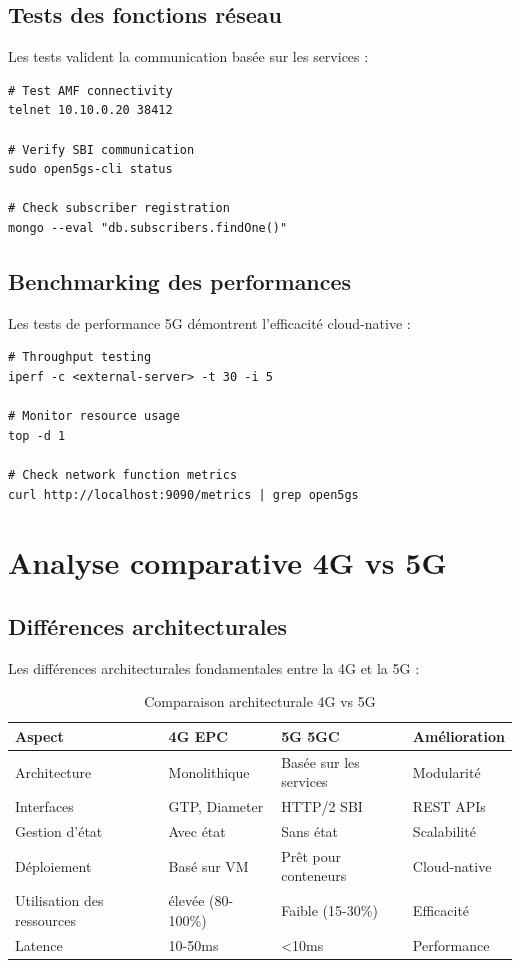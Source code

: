 \documentclass[12pt,a4paper]{report}
\begin{document}
\subsection{Tests des fonctions réseau}

Les tests valident la communication basée sur les services :

\begin{lstlisting}[caption=5G Network Function Testing]
# Test AMF connectivity
telnet 10.10.0.20 38412

# Verify SBI communication
sudo open5gs-cli status

# Check subscriber registration
mongo --eval "db.subscribers.findOne()"
\end{lstlisting}

\subsection{Benchmarking des performances}

Les tests de performance 5G démontrent l'efficacité cloud-native :

\begin{lstlisting}[caption=Tests de performance 5G]
# Throughput testing
iperf -c <external-server> -t 30 -i 5

# Monitor resource usage
top -d 1

# Check network function metrics
curl http://localhost:9090/metrics | grep open5gs
\end{lstlisting}

\section{Analyse comparative 4G vs 5G}

\subsection{Différences architecturales}

Les différences architecturales fondamentales entre la 4G et la 5G :

\begin{table}[H]
\centering
\caption{Comparaison architecturale 4G vs 5G}
\label{tab:architectural-comparison}
\begin{tabular}{@{}llll@{}}
\toprule
Aspect & 4G EPC & 5G 5GC & Amélioration \\
\midrule
Architecture & Monolithique & Basée sur les services & Modularité \\
Interfaces & GTP, Diameter & HTTP/2 SBI & REST APIs \\
Gestion d'état & Avec état & Sans état & Scalabilité \\
Déploiement & Basé sur VM & Prêt pour conteneurs & Cloud-native \\
Utilisation des ressources & élevée (80-100\%) & Faible (15-30\%) & Efficacité \\
Latence & 10-50ms & <10ms & Performance \\
\bottomrule
\end{tabular}
\end{table}
\end{document}
